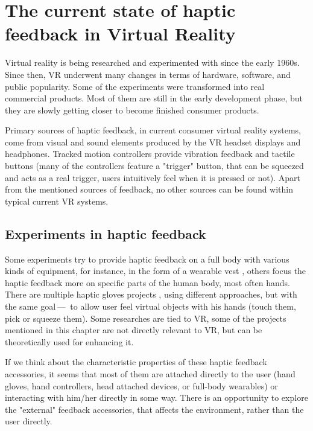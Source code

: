 \chapter{The current state of haptic feedback in Virtual Reality}

Virtual reality is being researched and experimented with since the early 1960s.
\cite{vrhistory} Since then, VR underwent many changes in terms of hardware,
software, and public popularity.
Some of the experiments were transformed into real commercial products.
Most of them are still in the early development phase, but they are slowly getting
closer to become finished consumer products.


Primary sources of haptic feedback, in current consumer virtual reality systems,
come from visual and sound elements produced by the VR headset displays and
headphones. Tracked
motion controllers provide vibration feedback and tactile buttons (many of
the controllers feature a "trigger" button, that can be squeezed and acts as
a real trigger, users intuitively feel when it is pressed or not).
Apart from the mentioned sources of feedback, no other sources can be found
within typical current VR systems.


\hypertarget{x-experiments-in-haptic-feedback}{\section{Experiments in haptic feedback}}
Some experiments try to provide haptic feedback on a full body with various
kinds of equipment, for instance, in the form of a wearable vest \cite{tfbhf},
others focus the haptic feedback more on specific parts of the
human body, most often hands. There are multiple haptic gloves projects
\cite{haptgloves}, using different approaches, but with the same goal — 
to allow user feel virtual objects with his hands
(touch them, pick or squeeze them). Some researches are tied to VR,
some of the projects mentioned in this chapter are not directly relevant
to VR, but can be theoretically used for enhancing it.


If we think about the characteristic properties of these haptic feedback
accessories, it seems that most of them are attached directly to the
user (hand gloves, hand controllers, head attached devices, or full-body wearables)
or interacting with him/her directly in some way. There is an opportunity to explore
the "external" feedback accessories, that affects the environment, rather than
the user directly.



